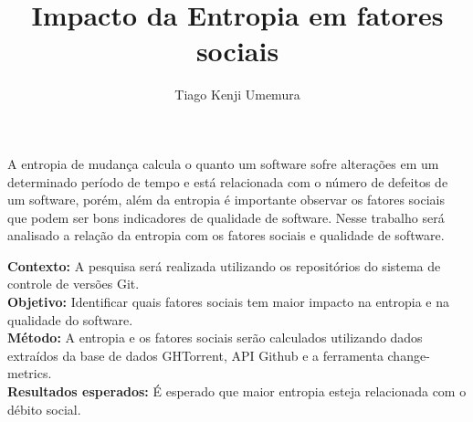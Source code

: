 \documentclass[12pt,english,brazil,a4paper,utf8,oneside]{utfpr-tcc}
\author{Tiago Kenji Umemura}  %
\title{Impacto da Entropia em fatores sociais} %
\begin{document}
	
\frontmatter
\maketitle

\begin{resumo}

A entropia de mudança calcula o quanto um software sofre alterações em um determinado período de tempo e está relacionada com o número de defeitos de um software, porém, além da entropia é importante observar os fatores sociais que podem ser bons indicadores de qualidade de software. Nesse trabalho será analisado a relação da entropia com os fatores sociais e qualidade de software.

\textbf{Contexto:} A pesquisa será realizada utilizando os repositórios do sistema de controle de versões Git.\\
 \textbf{Objetivo:} Identificar quais fatores sociais tem maior impacto na entropia e na qualidade do software. \\
 \textbf{Método:} A entropia e os fatores sociais serão calculados utilizando dados extraídos da base de dados GHTorrent, API Github e a ferramenta change-metrics.\\
 \textbf{Resultados esperados:} É esperado que maior entropia esteja relacionada com o débito social.

\end{resumo}






\listoffigures
\listoftables

\tableofcontents

\mainmatter
 
 
% 
% 



\backmatter
\end{document}
